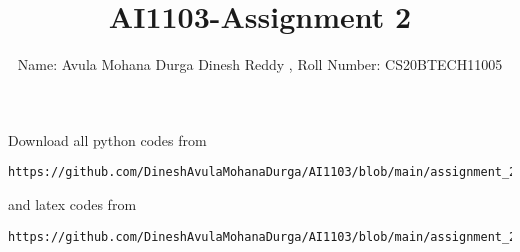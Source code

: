 \documentclass[journal,12pt,twocolumn]{IEEEtran}
\DeclareMathOperator*{\Res}{Res}
\begin{document}
\newcommand{\BEQA}{\begin{eqnarray}}
\newcommand{\EEQA}{\end{eqnarray}}
\newcommand{\define}{\stackrel{\triangle}{=}}

\raggedbottom
\setlength{\parindent}{0pt}
\providecommand{\mbf}{\mathbf}
\providecommand{\pr}[1]{\ensuremath{\Pr\left(#1\right)}}
\providecommand{\qfunc}[1]{\ensuremath{Q\left(#1\right)}}
\providecommand{\sbrak}[1]{\ensuremath{{}\left[#1\right]}}
\providecommand{\lsbrak}[1]{\ensuremath{{}\left[#1\right.}}
\providecommand{\rsbrak}[1]{\ensuremath{{}\left.#1\right]}}
\providecommand{\brak}[1]{\ensuremath{\left(#1\right)}}
\providecommand{\lbrak}[1]{\ensuremath{\left(#1\right.}}
\providecommand{\rbrak}[1]{\ensuremath{\left.#1\right)}}
\providecommand{\cbrak}[1]{\ensuremath{\left\{#1\right\}}}
\providecommand{\lcbrak}[1]{\ensuremath{\left\{#1\right.}}
\providecommand{\rcbrak}[1]{\ensuremath{\left.#1\right\}}}
\theoremstyle{remark}
\newtheorem{rem}{Remark}
\newcommand{\sgn}{\mathop{\mathrm{sgn}}}
\providecommand{\abs}[1]{\vert#1\vert}
\providecommand{\res}[1]{\Res\displaylimits_{#1}} 
\providecommand{\norm}[1]{\lVert#1\rVert}
\providecommand{\mtx}[1]{\mathbf{#1}}
\providecommand{\mean}[1]{E[ #1 ]}
\providecommand{\fourier}{\overset{\mathcal{F}}{ \rightleftharpoons}}
\providecommand{\system}{\overset{\mathcal{H}}{ \longleftrightarrow}}
\newcommand{\solution}{\noindent \textbf{Solution: }}
\newcommand{\cosec}{\,\text{cosec}\,}
\providecommand{\dec}[2]{\ensuremath{\overset{#1}{\underset{#2}{\gtrless}}}}
\newcommand{\myvec}[1]{\ensuremath{\begin{pmatrix}#1\end{pmatrix}}}
\newcommand{\mydet}[1]{\ensuremath{\begin{vmatrix}#1\end{vmatrix}}}
\makeatletter
{}
\makeatother
\let\StandardTheFigure\thefigure
\let\vec\mathbf
\renewcommand{\thefigure}{\theproblem}
\def\putbox#1#2#3{\makebox[0in][l]{\makebox[#1][l]{}\raisebox{\baselineskip}[0in][0in]{\raisebox{#2}[0in][0in]{#3}}}}
     \def\rightbox#1{\makebox[0in][r]{#1}}
     \def\centbox#1{\makebox[0in]{#1}}
     \def\topbox#1{\raisebox{-\baselineskip}[0in][0in]{#1}}
     \def\midbox#1{\raisebox{-0.5\baselineskip}[0in][0in]{#1}}
\vspace{3cm}
\title{AI1103-Assignment 2}
\author{Name: Avula Mohana Durga Dinesh Reddy , Roll Number: CS20BTECH11005}
\maketitle
\newpage
\bigskip
\renewcommand{\thefigure}{\theenumi}
\renewcommand{\thetable}{\theenumi}
Download all python codes from 
\begin{lstlisting}
https://github.com/DineshAvulaMohanaDurga/AI1103/blob/main/assignment_2/codes/ai1103_assignment1.py
\end{lstlisting}
%
and latex codes from 
%
\begin{lstlisting}
https://github.com/DineshAvulaMohanaDurga/AI1103/blob/main/assignment_2/main.tex
\end{lstlisting}
\end{document}
